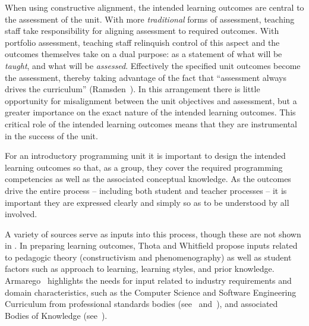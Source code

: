 When using constructive alignment, the intended learning outcomes are central to the assessment of the unit. With more \emph{traditional} forms of assessment, teaching staff take responsibility for aligning assessment to required outcomes. With portfolio assessment, teaching staff relinquish control of this aspect and the outcomes themselves take on a dual purpose: as a statement of what will be \emph{taught}, and what will be \emph{assessed}. Effectively the specified unit outcomes become the assessment, thereby taking advantage of the fact that ``assessment always drives the curriculum'' (Ramsden~\cite{Ramsden:1992}).  In this arrangement there is little opportunity for misalignment between the unit objectives and assessment, but a greater importance on the exact nature of the intended learning outcomes. This critical role of the intended learning outcomes means that they are instrumental in the success of the unit. 

For an introductory programming unit it is important to design the intended learning outcomes so that, as a group, they cover the required programming competencies as well as the associated conceptual knowledge. As the outcomes drive the entire process -- including both student and teacher processes -- it is important they are expressed clearly and simply so as to be understood by all involved.

A variety of sources serve as inputs into this process, though these are not shown in . In preparing learning outcomes, Thota and Whitfield propose inputs related to pedagogic theory (constructivism and phenomenography) as well as student factors such as approach to learning, learning styles, and prior knowledge. Armarego~\cite{Armarego:2009} highlights the needs for input related to industry requirements and domain characteristics, such as the Computer Science and Software Engineering Curriculum from professional standards bodies (see~\cite{Lethbridge:2006} and~\cite{Cassel:2008}), and associated Bodies of Knowledge (see~\cite{Abran:2001}).

